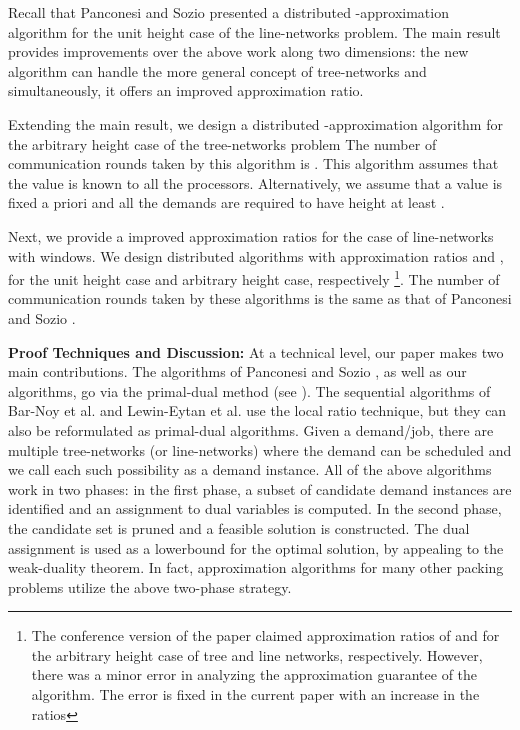 \documentclass[11pt]{article}
\begin{document}
Recall that Panconesi and Sozio \cite{Pancj} presented a 
distributed -approximation algorithm for the unit height case of the line-networks problem. 
The main result provides improvements over the above work along two dimensions:
the new algorithm can handle the more general concept of tree-networks and simultaneously, it
offers an improved approximation ratio. 

Extending the main result, we design a distributed -approximation algorithm for  the
arbitrary height case of the tree-networks problem
The number of communication rounds taken by this algorithm is
.
This algorithm assumes that the value  is known to all the processors.
Alternatively, we assume that a value  is fixed a priori
and all the demands are required to have height at least .

Next, we provide a improved approximation ratios
for the case of line-networks with windows. We design distributed algorithms
with approximation ratios  and , for the unit height case
and arbitrary height case, respectively
\footnote{The conference version of the paper \cite{podc} claimed approximation ratios of 
and  for the arbitrary height case of tree and line networks, respectively.
However, there was a minor error in analyzing the approximation guarantee of the algorithm.
The error is fixed in the current paper with an increase in the ratios}.
The number of communication rounds taken by these algorithms is the same as that
of Panconesi and Sozio \cite{Pancj}. 

\noindent
{\bf Proof Techniques and Discussion: }
At a technical level, our paper makes two main contributions. 
The algorithms of Panconesi and Sozio \cite{Pancj}, as well as our algorithms,
go via the primal-dual method (see \cite{ShmoysBook}). The sequential algorithms of Bar-Noy et al. \cite{Bar-Noy-Jacm}
and Lewin-Eytan et al. \cite{Lewin-Eytan} use the local ratio technique, but they
can also be reformulated as primal-dual algorithms. Given a demand/job,
there are multiple tree-networks (or line-networks) where the demand can be scheduled and we call each such possibility
as a demand instance. All of the above algorithms work in two phases: 
in the first phase, a subset of candidate demand instances are identified
and an assignment to dual variables is computed. In the second phase,
the candidate set is pruned and a feasible solution is constructed.
The dual assignment is used as a lowerbound for the optimal solution,
by appealing to the weak-duality theorem. In fact, approximation algorithms
for many other packing problems utilize the above two-phase strategy.
\end{document}
